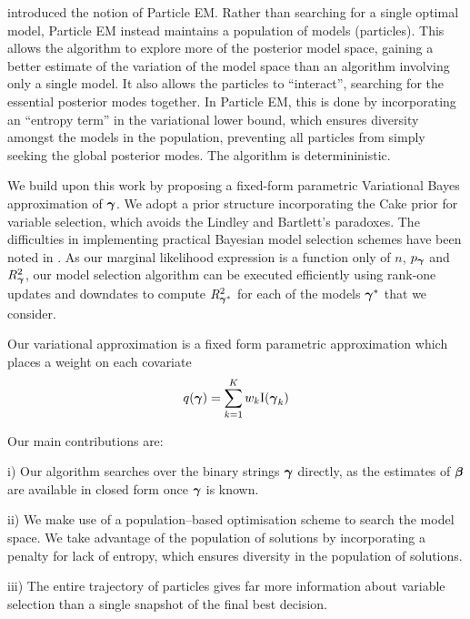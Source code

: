 \cite{Rockova2016} introduced the notion of Particle EM. Rather than searching for a single optimal model,
Particle EM instead maintains a population of models (particles). This allows the algorithm to explore more of
the posterior model space, gaining a better estimate of the variation of the model space than an algorithm
involving only a single model. It also allows the particles to ``interact'', searching for the essential
posterior modes together. In Particle EM, this is done by incorporating an ``entropy term'' in the variational
lower bound, which ensures diversity amongst the models in the population, preventing all particles from
simply seeking the global posterior modes. The algorithm is determininistic.

We build upon this work by proposing a fixed-form parametric Variational Bayes approximation of ${\boldsymbol \gamma}$. We
adopt a prior structure incorporating the Cake prior for variable selection, which avoids the Lindley and
Bartlett's paradoxes. The difficulties in implementing practical Bayesian model selection schemes have been
noted in \cite{Chipman2014}. As our marginal likelihood expression is a function only of $n$, $p_{\boldsymbol \gamma}$ and
$R^2_{\boldsymbol \gamma}$, our model selection algorithm can be executed efficiently using rank-one updates and downdates
to compute $R^2_{{\boldsymbol \gamma}^*}$ for each of the models ${\boldsymbol \gamma}^*$ that we consider.

Our variational approximation is a fixed form parametric approximation which places a weight on each covariate
\[
	q({\boldsymbol \gamma}) = \sum_{k=1}^K w_k \text{I}({\boldsymbol \gamma}_k)
\]


Our main contributions are:

i) Our algorithm searches over the binary strings ${\boldsymbol \gamma}$ directly, as the estimates of ${\boldsymbol \beta}$ are available 
in closed form once ${\boldsymbol \gamma}$ is known.

ii) We make use of a population--based optimisation scheme to search the model space. We take advantage of the
population of solutions by incorporating a penalty for lack of entropy, which ensures diversity in the
population of solutions.

iii) The entire trajectory of particles gives far more information about variable selection than a single
snapshot of the final best decision.

